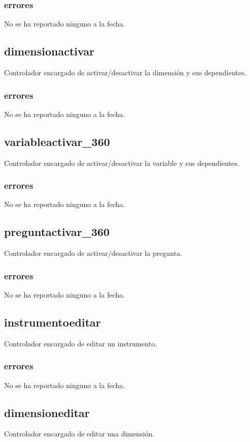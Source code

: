\documentclass[10pt,a4paper]{book}
\begin{document}
	\subsubsection{errores}
	No se ha reportado ninguno a la fecha.
	
	\subsection{dimensionactivar}
	Controlador encargado de activar/desactivar la dimensión y sus dependientes.
	\subsubsection{errores}
	No se ha reportado ninguno a la fecha.
	
	\subsection{variableactivar\_360}
	Controlador encargado de activar/desactivar la variable y sus dependientes.
	\subsubsection{errores}
	No se ha reportado ninguno a la fecha.
	
	\subsection{preguntactivar\_360}
	Controlador encargado de activar/desactivar la pregunta.
	\subsubsection{errores}
	No se ha reportado ninguno a la fecha.
	
	\subsection{instrumentoeditar}
	Controlador encargado de editar un instrumento.
	\subsubsection{errores}
	No se ha reportado ninguno a la fecha.
	
	\subsection{dimensioneditar}
	Controlador encargado de editar una dimensión.
\end{document}
